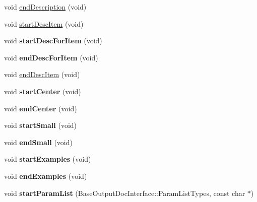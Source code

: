 \begin{DoxyCompactItemize}
void \mbox{\hyperlink{class_docbook_generator_accbb80f6730221e3396f38cbb07ed7b5}{end\+Description}} (void)
\item 
void \mbox{\hyperlink{class_docbook_generator_a20e9be1323c9378066b4302ec37fa67f}{start\+Desc\+Item}} (void)
\item 
\mbox{\label{class_docbook_generator_a627c43929d1dafab5072680128b6375f}} 
void {\bfseries start\+Desc\+For\+Item} (void)
\item 
\mbox{\label{class_docbook_generator_a66376d8ca881d18cb9916c7d903df18e}} 
void {\bfseries end\+Desc\+For\+Item} (void)
\item 
void \mbox{\hyperlink{class_docbook_generator_ae46437543719a73a35d0202749633c15}{end\+Desc\+Item}} (void)
\item 
\mbox{\label{class_docbook_generator_a98fef2b64d63f378b2616d09a679f66b}} 
void {\bfseries start\+Center} (void)
\item 
\mbox{\label{class_docbook_generator_a8b7b9b4f6a1876e34300b7f8969fbed9}} 
void {\bfseries end\+Center} (void)
\item 
\mbox{\label{class_docbook_generator_a9a32ad8f07c7b3cd0bc8deaf7a0e1597}} 
void {\bfseries start\+Small} (void)
\item 
\mbox{\label{class_docbook_generator_af78c3c3a1e8ab4fd275cc1364f29f96a}} 
void {\bfseries end\+Small} (void)
\item 
\mbox{\label{class_docbook_generator_a07374c2ae688cdf1a9978dbfff2636df}} 
void {\bfseries start\+Examples} (void)
\item 
\mbox{\label{class_docbook_generator_a438f8b5845f838d939b3d72d47b91fb6}} 
void {\bfseries end\+Examples} (void)
\item 
\mbox{\label{class_docbook_generator_a5a227d018bac4cff772175b1c604dc78}} 
void {\bfseries start\+Param\+List} (Base\+Output\+Doc\+Interface\+::\+Param\+List\+Types, const char $\ast$)
\item 

\end{DoxyCompactItemize}
